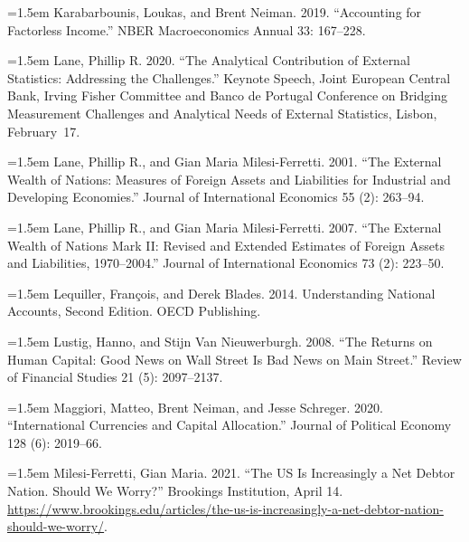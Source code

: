 \documentclass[11pt]{article}
\begin{document}
\noindent\hangindent=1.5em Karabarbounis, Loukas, and Brent Neiman. 2019. “Accounting for Factorless Income.” NBER Macroeconomics Annual 33: 167–228.\par

\noindent\hangindent=1.5em Lane, Phillip R. 2020. “The Analytical Contribution of External Statistics: Addressing the Challenges.” Keynote Speech, Joint European Central Bank, Irving Fisher Committee and Banco de Portugal Conference on Bridging Measurement Challenges and Analytical Needs of External Statistics, Lisbon, February 17.\par

\noindent\hangindent=1.5em Lane, Phillip R., and Gian Maria Milesi-Ferretti. 2001. “The External Wealth of Nations: Measures of Foreign Assets and Liabilities for Industrial and Developing Economies.” Journal of International Economics 55 (2): 263–94.\par

\noindent\hangindent=1.5em Lane, Phillip R., and Gian Maria Milesi-Ferretti. 2007. “The External Wealth of Nations Mark II: Revised and Extended Estimates of Foreign Assets and Liabilities, 1970–2004.” Journal of International Economics 73 (2): 223–50.\par

\noindent\hangindent=1.5em Lequiller, François, and Derek Blades. 2014. Understanding National Accounts, Second Edition. OECD Publishing.\par

\noindent\hangindent=1.5em Lustig, Hanno, and Stijn Van Nieuwerburgh. 2008. “The Returns on Human Capital: Good News on Wall Street Is Bad News on Main Street.” Review of Financial Studies 21 (5): 2097–2137.\par

\noindent\hangindent=1.5em Maggiori, Matteo, Brent Neiman, and Jesse Schreger. 2020. “International Currencies and Capital Allocation.” Journal of Political Economy 128 (6): 2019–66.\par

\noindent\hangindent=1.5em Milesi-Ferretti, Gian Maria. 2021. “The US Is Increasingly a Net Debtor Nation. Should We Worry?” Brookings Institution, April 14. \url{https://www.brookings.edu/articles/the-us-is-increasingly-a-net-debtor-nation-should-we-worry/}.\par
\end{document}
